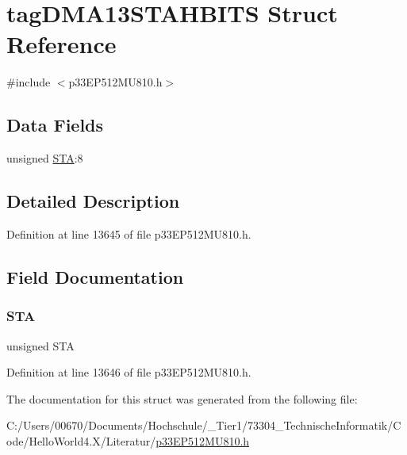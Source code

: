 \hypertarget{structtag_d_m_a13_s_t_a_h_b_i_t_s}{}\section{tag\+D\+M\+A13\+S\+T\+A\+H\+B\+I\+TS Struct Reference}
\label{structtag_d_m_a13_s_t_a_h_b_i_t_s}


{\ttfamily \#include $<$p33\+E\+P512\+M\+U810.\+h$>$}

\subsection*{Data Fields}
\begin{DoxyCompactItemize}
\item 
unsigned \hyperlink{structtag_d_m_a13_s_t_a_h_b_i_t_s_a0eec78ddd2c12af678d5fab70fe62d14}{S\+TA}\+:8
\end{DoxyCompactItemize}


\subsection{Detailed Description}


Definition at line 13645 of file p33\+E\+P512\+M\+U810.\+h.



\subsection{Field Documentation}
\mbox{\label{structtag_d_m_a13_s_t_a_h_b_i_t_s_a0eec78ddd2c12af678d5fab70fe62d14}} 
\subsubsection{\texorpdfstring{S\+TA}{STA}}
{\footnotesize\ttfamily unsigned S\+TA}



Definition at line 13646 of file p33\+E\+P512\+M\+U810.\+h.



The documentation for this struct was generated from the following file\+:\begin{DoxyCompactItemize}
\item 
C\+:/\+Users/00670/\+Documents/\+Hochschule/\+\_\+\+Tier1/73304\+\_\+\+Technische\+Informatik/\+Code/\+Hello\+World4.\+X/\+Literatur/\hyperlink{p33_e_p512_m_u810_8h}{p33\+E\+P512\+M\+U810.\+h}\end{DoxyCompactItemize}
